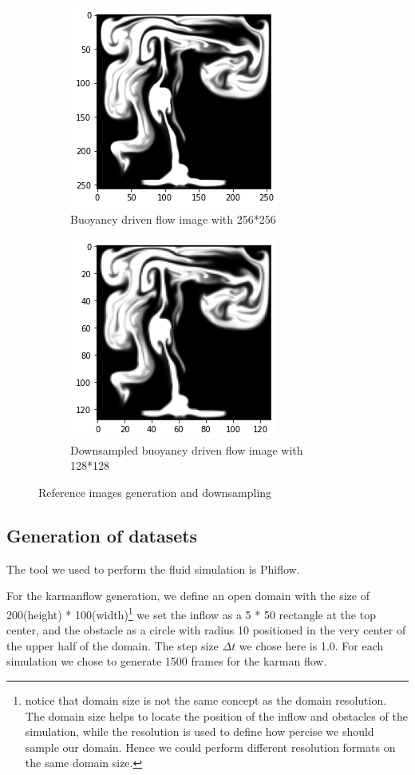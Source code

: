 \documentclass[a4paper,12pt,twoside]{report}
\begin{document}
\begin{figure}
\centering
\begin{subfigure}{0.4\textwidth}
  \centering
  \includegraphics[scale=0.5]{buoyancy_high.png}
  \caption{Buoyancy driven flow image with 256*256}
\end{subfigure}
\begin{subfigure}{0.4\textwidth}
  \centering
  \includegraphics[scale=0.5]{buoyancy_ds.png}
  \caption{Downsampled buoyancy driven flow image with 128*128}
\end{subfigure}
\caption{Reference images generation and downsampling}
\end{figure}
\subsection{Generation of datasets}
The tool we used to perform the fluid simulation is Phiflow\cite{holl2020learning}. 

For the karmanflow generation, we define an open domain with the size of 200(height) * 100(width)\footnote{notice that domain size is not the same concept as the domain resolution. The domain size helps to locate the position of the inflow and obstacles of the simulation, while the resolution is used to define how percise we should sample our domain. Hence we could perform different resolution formats on the same domain size.} we set the inflow as a 5 * 50 rectangle at the top center, and the obstacle as a circle with radius 10 positioned in the very center of the upper half of the domain. The step size $\Delta t$ we chose here is 1.0. For each simulation we chose to generate 1500 frames for the karman flow.
\end{document}
